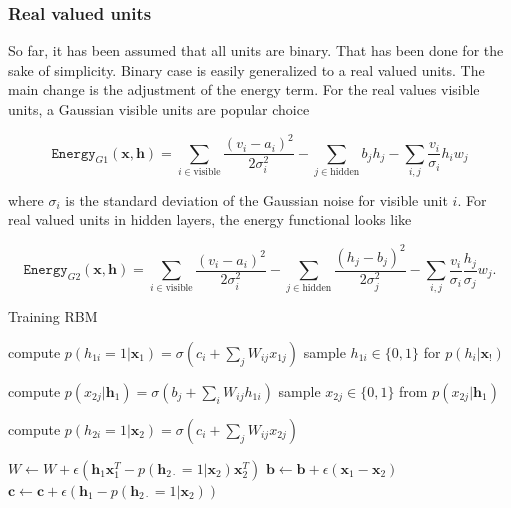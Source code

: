 \subsubsection{Real valued units}

So far, it has been assumed that all units are binary. That has been done for the sake of simplicity. Binary case is easily generalized to a real valued units. The main change is the adjustment of the energy term. For the real values visible units, a Gaussian visible units are popular choice

\begin{equation}
	\mathtt{Energy}_{G1}(\mathbf{x}, \mathbf{h}) = \sum_{i \in \text{visible}}\frac{(v_i - a_i)^2}{2\sigma_i^2} - \sum_{j \in \text{hidden}} b_jh_j - \sum_{i,j}\frac{v_i}{\sigma_i}h_iw_j
\end{equation}

where $\sigma_i$ is the standard deviation of the Gaussian noise for visible unit $i$. For real valued units in hidden layers, the energy functional looks like

\begin{equation}
	\mathtt{Energy}_{G2}(\mathbf{x}, \mathbf{h}) = \sum_{i \in \text{visible}}\frac{(v_i - a_i)^2}{2\sigma_i^2} - \sum_{j \in \text{hidden}} \frac{(h_j - b_j)^2}{2\sigma_j^2} - \sum_{i,j}\frac{v_i}{\sigma_i}\frac{h_j}{\sigma_j}w_j.
\end{equation}




\begin{algorithm}
	\caption{Training RBM}
	\label{alg:RBM}
	\begin{algorithmic}[1]
		\Repeat
				\State compute $p(h_{1i}=1|\mathbf{x}_1) = \sigma \left ( c_i + \sum_jW_{ij}x_{1j}  \right )$
				\State sample $h_{1i} \in \{ 0,1 \}$ for $p(h_i|\mathbf{x}_!)$
			\EndFor
			
				\State compute $p(x_{2j}|\mathbf{h}_1) = \sigma \left ( b_j + \sum_iW_{ij}h_{1i} \right )$
				\State sample $x_{2j} \in \{ 0,1 \}$ from $p(x_{2j}|\mathbf{h}_1)$
			\EndFor
			
				\State compute $p(h_{2i}=1|\mathbf{x}_2) = \sigma \left ( c_i + \sum_jW_{ij}x_{2j}  \right )$
			\EndFor
			
			\State $W \gets W + \epsilon \left ( \mathbf{h}_1 \mathbf{x}_1^T - p(\mathbf{h}_{2\cdot} = 1|\mathbf{x}_2)\mathbf{x}_2^T\right )$
			\State $\mathbf{b} \gets \mathbf{b} + \epsilon ( \mathbf{x}_1 - \mathbf{x}_2  )$
			\State $\mathbf{c} \gets \mathbf{c} + \epsilon (\mathbf{h}_1 -  p(\mathbf{h}_{2\cdot} = 1|\mathbf{x}_2))$
		\EndFunction
	\end{algorithmic}
\end{algorithm}

